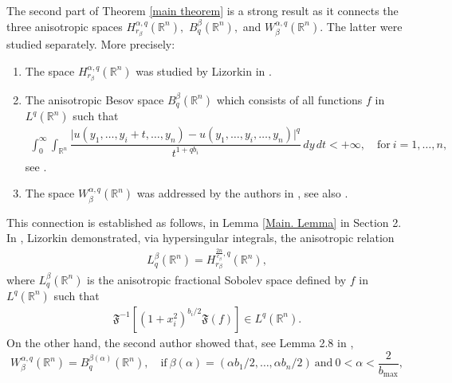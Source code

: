 \documentclass[10pt, leqno]{article}
\theoremstyle{definition}
\theoremstyle{remark}
\numberwithin{equation}{section}
\begin{document}
The second part of Theorem \ref{main theorem} is a strong result as it connects the three anisotropic spaces $H_{r_{\beta}}^{\alpha, q}(\mathbb{R}^{n}),$ $B^{\beta}_{q}(\mathbb{R}^{n}),$ and $W_{\beta}^{\alpha, q}(\mathbb{R}^{n}) .$ The latter were studied separately. More precisely:
\begin{enumerate}
\item The space $H_{r_{\beta}}^{\alpha, q}(\mathbb{R}^{n})$ was studied by Lizorkin in \cite{LIZORKIN 1, LIZORKIN 2}.
\item The anisotropic Besov space $B^{\beta}_{q}(\mathbb{R}^{n})$ which consists of all functions $f$ in $L^{q}(\mathbb{R}^{n})$ such that
\begin{eqnarray*}
\int_{0}^{\infty} \int_{\mathbb{R}^{n}} \dfrac{\vert u (y_{1}, \dots, y_{i} + t, \dots, y_{n}) -  u (y_{1}, \dots, y_{i}, \dots, y_{n}) \vert^{q}}{t^{1 + qb_{i}}} \, dy \, dt < + \infty, \quad \text{for} \ i=1, \dots, n,
\end{eqnarray*}
see \cite{BESOV-I-N, LONG-TRIEBEL, SCHMEISSER-TRIEBEL}.
\item The space $W_{\beta}^{\alpha, q}(\mathbb{R}^{n}) $ was addressed by the authors in \cite{LEITAO LP}, see also \cite{LONG-TRIEBEL}.
\end{enumerate}
This connection is established as follows, in Lemma \ref{Main. Lemma} in Section 2. In \cite{LIZORKIN 2}, Lizorkin demonstrated, via hypersingular integrals, the anisotropic relation
\begin{eqnarray}
\label{LIZORKIN}
L^{\beta}_{q}(\mathbb{R}^{n}) = H_{r_{\beta^{}}}^{\frac{2n}{c_{\beta}}, q}(\mathbb{R}^{n}),
\end{eqnarray}
where $L^{\beta}_{q}(\mathbb{R}^{n})$ is the anisotropic fractional Sobolev space defined by $f$ in $L^{q}(\mathbb{R}^{n})$ such that
\begin{eqnarray}
 \mathfrak{F}^{-1}\left[ \left( 1 + x^{2}_{i}\right)^{b_{i}/2}\mathfrak{F}(f)\right] \in L^{q}(\mathbb{R}^{n}).
\end{eqnarray}
On the other hand, the second author showed that, see Lemma 2.8 in \cite{LEITAO LP},
$$
W_{\beta}^{\alpha, q}(\mathbb{R}^{n}) = B^{\beta(\alpha)}_{q}(\mathbb{R}^{n}), \quad \text{if} \ \beta(\alpha) = (\alpha b_{1} /2 ,\dots,  \alpha b_{n} /2) \ \text{and} \ 0 < \alpha < \dfrac{2}{b_{\max}},
$$
\end{document}
